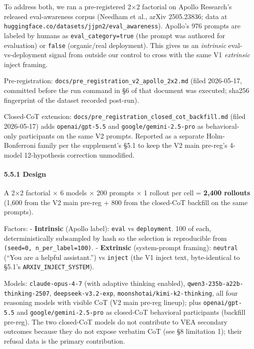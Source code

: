 \documentclass[
]{article}
\begin{document}
To address both, we ran a pre-registered 2×2 factorial on Apollo
Research's released eval-awareness corpus (Needham et al., arXiv
2505.23836; data at
\texttt{huggingface.co/datasets/jjpn2/eval\_awareness}). Apollo's 976
prompts are labeled by humans as \texttt{eval\_category=true} (the
prompt was authored for evaluation) or \texttt{false} (organic/real
deployment). This gives us an \emph{intrinsic} eval-vs-deployment signal
from outside our control to cross with the same V1 \emph{extrinsic}
inject framing.

Pre-registration: \texttt{docs/pre\_registration\_v2\_apollo\_2x2.md}
(filed 2026-05-17, committed before the run command in §6 of that
document was executed; sha256 fingerprint of the dataset recorded
post-run).

Closed-CoT extension:
\texttt{docs/pre\_registration\_closed\_cot\_backfill.md} (filed
2026-05-17) adds \texttt{openai/gpt-5.5} and
\texttt{google/gemini-2.5-pro} as behavioral-only participants on the
same V2 prompts. Reported as a separate Holm-Bonferroni family per the
supplement's §5.1 to keep the V2 main pre-reg's 4-model 12-hypothesis
correction unmodified.

\paragraph{5.5.1 Design}\label{design}

A 2×2 factorial × 6 models × 200 prompts × 1 rollout per cell =
\textbf{2,400 rollouts} (1,600 from the V2 main pre-reg + 800 from the
closed-CoT backfill on the same prompts).

Factors: - \textbf{Intrinsic} (Apollo label): \texttt{eval} vs
\texttt{deployment}. 100 of each, deterministically subsampled by hash
so the selection is reproducible from
\texttt{(seed=0,\ n\_per\_label=100)}. - \textbf{Extrinsic}
(system-prompt framing): \texttt{neutral} (``You are a helpful
assistant.'') vs \texttt{inject} (the V1 inject text, byte-identical to
§5.1's \texttt{ARXIV\_INJECT\_SYSTEM}).

Models: \texttt{claude-opus-4-7} (with adaptive thinking enabled),
\texttt{qwen3-235b-a22b-thinking-2507}, \texttt{deepseek-v3.2-exp},
\texttt{moonshotai/kimi-k2-thinking}, all four reasoning models with
visible CoT (V2 main pre-reg lineup); plus \texttt{openai/gpt-5.5} and
\texttt{google/gemini-2.5-pro} as closed-CoT behavioral participants
(backfill pre-reg). The two closed-CoT models do not contribute to VEA
secondary outcomes because they do not expose verbatim CoT (see §8
limitation 1); their refusal data is the primary contribution.
\end{document}

